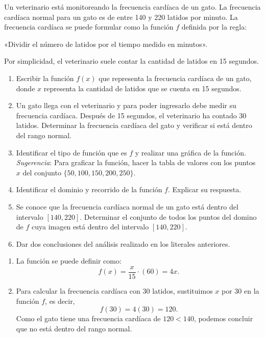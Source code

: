 \documentclass[11pt,respuestas,a4]{aleph-examen}
\begin{document}
\begin{preguntas}

\item 
    Un veterinario está monitoreando la frecuencia cardíaca de un gato. La frecuencia cardíaca normal para un gato es de entre 140 y 220 latidos por minuto. La frecuencia cardíaca se puede formular como la función $f$ definida por la regla:
    \begin{center}
    	«Dividir el número de latidos por el tiempo medido en minutos».
    \end{center}
    Por simplicidad, el veterinario suele contar la cantidad de latidos en 15 segundos.
    \begin{enumerate}[label=\textit{\alph*)}]
    \item 
        Escribir la función $f(x)$ que representa la frecuencia cardíaca de un gato, donde $x$ representa la cantidad de latidos que se cuenta en 15 segundos. 
    \item 
        Un gato llega con el veterinario y para poder ingresarlo debe medir su frecuencia cardíaca. Después de 15 segundos, el veterinario ha contado 30 latidos. Determinar la frecuencia cardíaca del gato y verificar si está dentro del rango normal.
    \item 
        Identificar el tipo de función que es $f$ y realizar una gráfica de la función. \textit{Sugerencia}: Para graficar la función, hacer la tabla de valores con los puntos $x$ del conjunto $\{50,100,150,200,250\}$.
    \item 
        Identificar el dominio y recorrido de la función $f$. Explicar su respuesta.
    \item 
        Se conoce que la frecuencia cardíaca normal de un gato está dentro del intervalo $[140,220]$. Determinar el conjunto de todos los puntos del domino de $f$ cuya imagen está dentro del intervalo $[140,220]$.
    \item 
        Dar dos conclusiones del análisis realizado en los literales anteriores.
    \end{enumerate}
\begin{respuesta}
\begin{enumerate}[label=\textit{\alph*)}]
    \item
        La función se puede definir como:
        \[
            f(x) = \frac{x}{15} \cdot (60) = 4x.
        \]
    
    \item 
        Para calcular la frecuencia cardíaca con 30 latidos, sustituimos $x$ por $30$ en la función $f$, es decir,
        \[
            f(30) = 4(30) = 120.
        \]
        Como el gato tiene una frecuencia cardíaca de $120<140$, podemos concluir que no está dentro del rango normal.
    

\end{enumerate}
\end{respuesta}
\end{preguntas}
\end{document}
